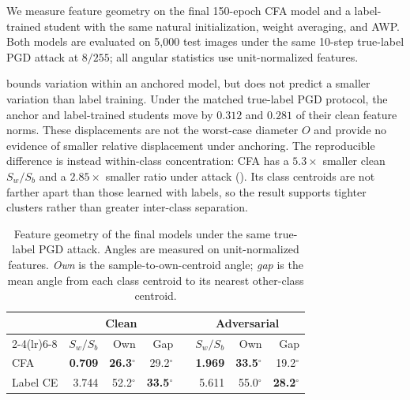 We measure feature geometry on the final 150-epoch CFA model and a label-trained student with the
same natural initialization, weight averaging, and AWP. Both models are evaluated on 5,000 test
images under the same 10-step true-label PGD attack at $8/255$; all angular statistics use
unit-normalized features.

 bounds variation within an anchored model, but does not predict a smaller
variation than label training. Under the matched true-label PGD protocol, the anchor and
label-trained students move by $0.312$ and $0.281$ of their clean feature norms. These
displacements are not the worst-case diameter $O$ and provide no evidence of smaller relative
displacement under anchoring. The reproducible difference is instead within-class concentration:
CFA has a $5.3\times$ smaller clean $S_w/S_b$ and a $2.85\times$ smaller ratio under attack
(). Its class centroids are not farther apart than those learned with labels,
so the result supports tighter clusters rather than greater inter-class separation.

\begin{table}[!htbp]
  \centering \small \setlength{\tabcolsep}{4pt}
  \caption{Feature geometry of the final models under the same true-label PGD attack. Angles are
  measured on unit-normalized features. \emph{Own} is the
  sample-to-own-centroid angle; \emph{gap} is the mean angle from each class centroid to its
  nearest other-class centroid.}
  \label{tab:anchorgeometry}
  \begin{tabular}{lrrrcrrr}
    \toprule
    & \multicolumn{3}{c}{Clean} & & \multicolumn{3}{c}{Adversarial} \\
    \cmidrule(lr){2-4}\cmidrule(lr){6-8}
    & $S_w/S_b$ & Own & Gap & & $S_w/S_b$ & Own & Gap \\
    \midrule
    CFA & \textbf{0.709} & \textbf{26.3$^\circ$} & 29.2$^\circ$ && \textbf{1.969} & \textbf{33.5$^\circ$} & 19.2$^\circ$ \\
    Label CE & 3.744 & 52.2$^\circ$ & \textbf{33.5$^\circ$} && 5.611 & 55.0$^\circ$ & \textbf{28.2$^\circ$} \\
    \bottomrule
  \end{tabular}
\end{table}



